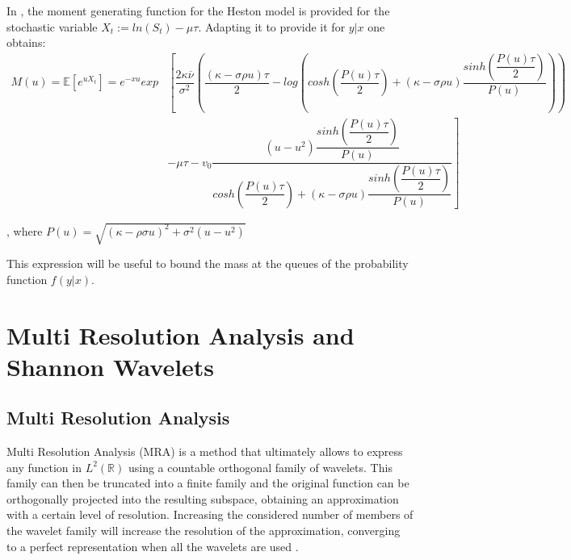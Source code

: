 \documentclass[12,twoside]{mammeTFM}
\newtheorem{lem}[thm]{Lemma}
\theoremstyle{definition}
\theoremstyle{remark}
\newcommand{\R}{\ensuremath{\mathbb{R}}}
\begin{document}
In \cite{rol09}, the moment generating function for the Heston model is provided for the stochastic variable $X_t := ln(S_t) - \mu \tau$. Adapting it to provide it for $y|x$ one obtains:
\begin{equation}
\begin{aligned}
M(u)=\mathbb{E}\left[ e^{u X_{t}}\right] = e^{- x u} exp & \left[ \dfrac{2 \kappa \overline{\nu}}{\sigma^{2}} \left( \dfrac{(\kappa-\sigma \rho u) \tau}{2} - log \left(cosh \left(\dfrac{P(u) \tau}{2} \right)+(\kappa-\sigma \rho u) \dfrac{sinh \left(\dfrac{P(u) \tau}{2} \right)}{P(u)}\right) \right) \right. \\
& \left. -\mu \tau -v_{0} \dfrac{\left(u-u^{2}\right) \dfrac{sinh \left(\dfrac{P(u) \tau}{2} \right)}{P(u)}}{cosh \left(\dfrac{P(u) \tau}{2} \right)+(\kappa-\sigma \rho u) \dfrac{sinh \left(\dfrac{P(u) \tau}{2} \right)}{P(u)}} \right]
\end{aligned}
\end{equation}

, where $P(u)=\sqrt{(\kappa -\rho \sigma u)^{2}+\sigma^{2}\left(u-u^{2}\right)}$

This expression will be useful to bound the mass at the queues of the probability function $f(y|x)$.



\section{Multi Resolution Analysis and Shannon Wavelets}

\subsection{Multi Resolution Analysis} \label{def:mra}
Multi Resolution Analysis (MRA) is a method that ultimately allows to express any function in $L^2(\R)$ using a countable orthogonal family of wavelets. This family can then be truncated into a finite family and the original function can be orthogonally projected into the resulting subspace, obtaining an approximation with a certain level of resolution. Increasing the considered number of members of the wavelet family will increase the resolution of the approximation, converging to a perfect representation when all the wavelets are used \cite{tour}.
\end{document}
